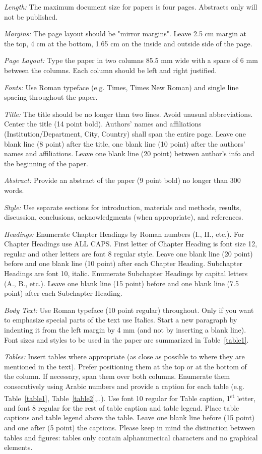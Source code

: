 \documentclass[nouppercase]{cmbec}
\begin{document}
\textit{Length:} The maximum document size for papers is four pages. Abstracts only will not be published.

\textit{Margins:} The page layout should be "mirror margins". Leave 2.5 cm margin at the top, 4 cm at the bottom, 1.65 cm on the inside and outside side of the page.

\textit{Page Layout:} Type the paper in two columns 85.5 mm wide with a space of 6 mm between the columns. Each column should be left and right justified.

\textit{Fonts:} Use Roman typeface (e.g. Times, Times New Roman) and single line spacing throughout the paper.

\textit{Title:} The title should be no longer than two lines. Avoid unusual abbreviations. Center the title (14 point bold). Authors' names and affiliations (Institution/Department, City, Country) shall span the entire page. Leave one blank line (8 point) after the title, one blank line (10 point) after the authors' names and affiliations. Leave one blank line (20 point) between author's info and the beginning of the paper.

\textit{Abstract:} Provide an abstract of the paper (9 point bold) no longer than 300 words.

\textit{Style:} Use separate sections for introduction, materials and methods, results, discussion, conclusions, acknowledgments (when appropriate), and references.

\textit{Headings:} Enumerate Chapter Headings by Roman numbers (I., II., etc.). For Chapter Headings use ALL CAPS. First letter of Chapter Heading is font size 12, regular and other letters are font 8 regular style. Leave one blank line (20 point) before and one blank line (10 point) after each Chapter Heading. Subchapter Headings are font 10, italic. Enumerate Subchapter Headings by capital letters (A., B., etc.). Leave one blank line (15 point) before and one blank line (7.5 point) after each Subchapter Heading.

\textit{Body Text:} Use Roman typeface (10 point regular) throughout. Only if you want to emphasize special parts of the text use Italics. Start a new paragraph by indenting it from the left margin by 4 mm (and not by inserting a blank line). Font sizes and styles to be used in the paper are summarized in Table~\ref{table1}.

\textit{Tables:} Insert tables where appropriate (as close as possible to where they are mentioned in the text). Prefer positioning them at the top or at the bottom of the column. If necessary, span them over both columns. Enumerate them consecutively using Arabic numbers and provide a caption for each table (e.g. Table~\ref{table1}, Table~\ref{table2},..). Use font 10 regular for Table caption, 1\textsuperscript{st} letter, and font 8 regular for the rest of table caption and table legend. Place table captions and table legend above the table. Leave one blank line before (15 point) and one after (5 point) the captions. Please keep in mind the distinction between tables and figures: tables only contain alphanumerical characters and no graphical elements.
\end{document}
